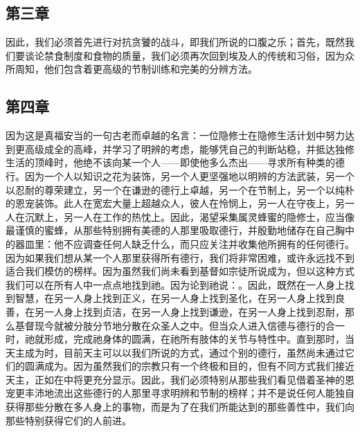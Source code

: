 \subsection{第三章}

\par

因此，我们必须首先进行对抗贪饕的战斗，即我们所说的口腹之乐；首先，既然我们要谈论禁食制度和食物的质量，我们必须再次回到埃及人的传统和习俗，因为众所周知，他们包含着更高级的节制训练和完美的分辨方法。\par


\subsection{第四章}

\par

因为这是真福安当的一句古老而卓越的名言：一位隐修士在隐修生活计划中努力达到更高级成全的高峰，并学习了明辨的考虑，能够凭自己的判断站稳，并抵达独修生活的顶峰时，他绝不该向某一个人——即使他多么杰出——寻求所有种类的德行。因为一个人以知识之花为装饰，另一个人更坚强地以明辨的方法武装，另一个以忍耐的尊荣建立，另一个在谦逊的德行上卓越，另一个在节制上，另一个以纯朴的恩宠装饰。此人在宽宏大量上超越众人，彼人在怜悯上，另一人在守夜上，另一人在沉默上，另一人在工作的热忱上。因此，渴望采集属灵蜂蜜的隐修士，应当像最谨慎的蜜蜂，从那些特别拥有美德的人那里吸取德行，并殷勤地储存在自己胸中的器皿里：他不应调查任何人缺乏什么，而只应关注并收集他所拥有的任何德行。因为如果我们想从某一个人那里获得所有德行，我们将非常困难，或许永远找不到适合我们模仿的榜样。因为虽然我们尚未看到基督如宗徒所说成为，但以这种方式我们可以在所有人中一点点地找到祂。因为论到祂说：。因此，既然在一人身上找到智慧，在另一人身上找到正义，在另一人身上找到圣化，在另一人身上找到良善，在另一人身上找到贞洁，在另一人身上找到谦逊，在另一人身上找到忍耐，那么基督现今就被分肢分节地分散在众圣人之中。但当众人进入信德与德行的合一时，祂就形成，完成祂身体的圆满，在祂所有肢体的关节与特性中。直到那时，当天主成为时，目前天主可以以我们所说的方式，通过个别的德行，虽然尚未通过它们的圆满成为。因为虽然我们的宗教只有一个终极和目的，但有不同方式我们接近天主，正如在中将更充分显示。因此，我们必须特别从那些我们看见借着圣神的恩宠更丰沛地流出这些德行的人那里寻求明辨和节制的榜样；并不是说任何人能独自获得那些分散在多人身上的事物，而是为了在我们所能达到的那些善性中，我们向那些特别获得它们的人前进。\par

